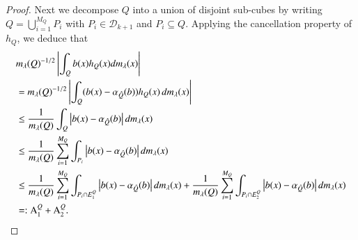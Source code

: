 \documentclass[12pt]{amsart}
\begin{document}
\begin{proof}
Next we decompose $Q$ into a union of disjoint sub-cubes by writing $Q=\bigcup_{i=1}^{M_Q}P_{i}$ with $P_{i}\in\mathcal{D}_{k+1}$ and $P_{i}\subseteq Q$.
Applying the cancellation property of $h_{Q}$, we deduce that
\begin{align}\label{comcom2}
&m_\lambda(Q)^{-1/2}\left|\int_{Q}b(x)h_{Q}(x)dm_\lambda(x)\right|\nonumber\\
&=m_\lambda(Q)^{-1/2}\left|\int_{Q}(b(x)-\alpha_{\hat{Q}}(b))h_{Q}(x)\,dm_\lambda(x)\right|\nonumber\\
&\leq \frac{1}{m_\lambda(Q)}\int_{Q}\left|b(x)-\alpha_{\hat{Q}}(b)\right|dm_\lambda(x)\nonumber\\
&\leq \frac{1}{m_\lambda(Q)}\sum_{i=1}^{M_Q}\int_{P_{i}}\left|b(x)-\alpha_{\hat{Q}}(b)\right|dm_\lambda(x)\nonumber\\
&\leq \frac{1}{m_\lambda(Q)}\sum_{i=1}^{M_Q}\int_{P_{i}\cap E_{1}^{Q}}\left|b(x)-\alpha_{\hat{Q}}(b)\right|dm_\lambda(x)+ \frac{1}{m_\lambda(Q)}\sum_{i=1}^{M_Q}\int_{P_{i}\cap E_{2}^{Q}}\left|b(x)-\alpha_{\hat{Q}}(b)\right|dm_\lambda(x)\nonumber\\
&=:{\rm A}_{1}^{Q}+{\rm A}_{2}^{Q}.
\end{align}


\end{proof}
\end{document}
